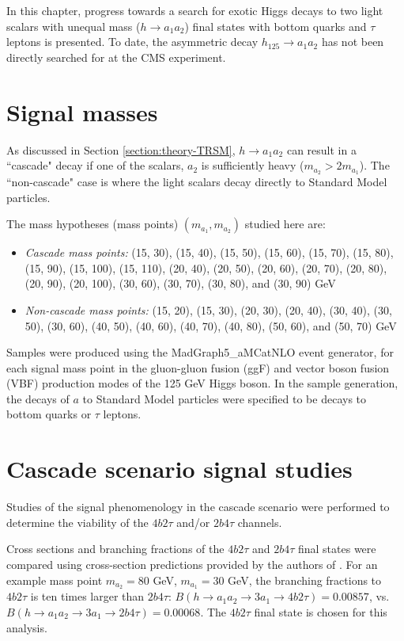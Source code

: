 In this chapter, progress towards a search for exotic Higgs decays to two light scalars with unequal mass ($h \rightarrow a_1 a_2$) final states with bottom quarks and $\tau$ leptons is presented. To date, the asymmetric decay $h_{125} \rightarrow a_1 a_2$ has not been directly searched for at the CMS experiment.

\section{Signal masses}
As discussed in Section \ref{section:theory-TRSM}, $h \rightarrow a_1 a_2$ can result in a ``cascade" decay if one of the scalars, $a_2$ is sufficiently heavy ($m_{a_2} > 2m_{a_1}$). The ``non-cascade" case is where the light scalars decay directly to Standard Model particles. 

The mass hypotheses (mass points) $(m_{a_1}, m_{a_2})$ studied here are:
\begin{itemize}
    \item \textit{Cascade mass points:} (15, 30), (15, 40), (15, 50), (15, 60), (15, 70), (15, 80), (15, 90), (15, 100), (15, 110), (20, 40), (20, 50), (20, 60), (20, 70), (20, 80), (20, 90), (20, 100), (30, 60), (30, 70), (30, 80), and (30, 90) GeV
    \item \textit{Non-cascade mass points:} (15, 20), (15, 30), (20, 30), (20, 40), (30, 40), (30, 50), (30, 60), (40, 50), (40, 60), (40, 70), (40, 80), (50, 60), and (50, 70) GeV
\end{itemize}
Samples were produced using the MadGraph5\_aMCatNLO event generator, for each signal mass point in the gluon-gluon fusion (ggF) and vector boson fusion (VBF) production modes of the 125 GeV Higgs boson. In the sample generation, the decays of $a$ to Standard Model particles were specified to be decays to bottom quarks or $\tau$ leptons.


\section{Cascade scenario signal studies}
Studies of the signal phenomenology in the cascade scenario were performed to determine the viability of the $4b2\tau$ and/or $2b4\tau$ channels. 

Cross sections and branching fractions of the $4b2\tau$ and $2b4\tau$ final states were compared using cross-section predictions provided by the authors of \cite{Robens:2019kga}. For an example mass point $m_{a_2} = 80$ GeV, $m_{a_1} = 30$ GeV, the branching fractions to $4b2\tau$ is ten times larger than $2b4\tau$: $B(h \rightarrow a_1 a_2 \rightarrow 3 a_1 \rightarrow 4b2\tau) = 0.00857$, vs. $B(h \rightarrow a_1 a_2 \rightarrow 3 a_1 \rightarrow 2b4\tau) = 0.00068$. The $4b2\tau$ final state is chosen for this analysis.

